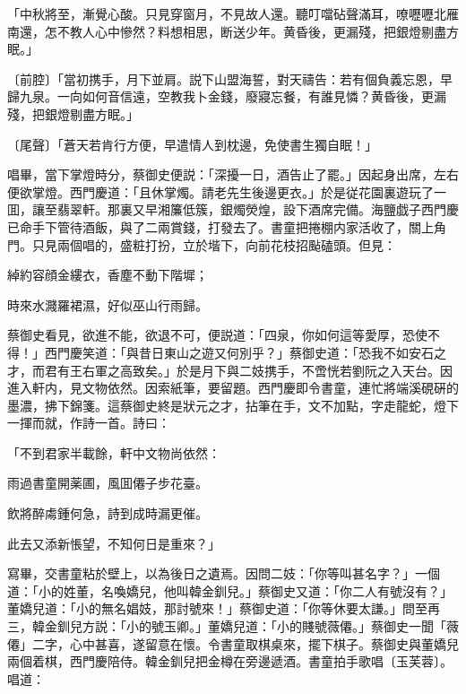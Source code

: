 \begin{myquote}
「中秋將至，漸覺心酸。只見穿窗月，不見故人還。聽叮噹砧聲滿耳，嘹嚦嚦北雁南還，怎不教人心中慘然？料想相思，断送少年。黄昏後，更漏殘，把銀燈剔盡方眠。」

{\markfont〔前腔〕}「當初携手，月下並肩。説下山盟海誓，對天禱告：若有個負義忘恩，早歸九泉。一向如何音信遠，空教我卜金錢，廢寢忘餐，有誰見憐？黄昏後，更漏殘，把銀燈剔盡方眠。」

{\markfont〔尾聲〕}「蒼天若肯行方便，早遣情人到枕邊，免使書生獨自眠！」
\end{myquote}

唱畢，當下掌燈時分，蔡御史便説：「深擾一日，酒告止了罷。」因起身出席，左右便欲掌燈。西門慶道：「且休掌燭。請老先生後邊更衣。」於是従花園裏遊玩了一囬，讓至翡翠軒。那裏又早湘簾低簇，銀燭熒煌，設下酒席完備。海鹽戯子西門慶已命手下管待酒飯，與了二兩賞錢，打發去了。書童把捲棚内家活收了，關上角門。只見兩個唱的，盛粧打扮，立於堦下，向前花枝招颭磕頭。但見：

\begin{myquote}
綽約容顔金縷衣，香塵不動下階墀；

時來水濺羅裙濕，好似巫山行雨歸。
\end{myquote}

蔡御史看見，欲進不能，欲退不可，便説道：「四泉，你如何這等愛厚，恐使不得！」西門慶笑道：「與昔日東山之遊又何別乎？」蔡御史道：「恐我不如安石之才，而君有王右軍之高致矣。」於是月下與二妓携手，不啻恍若劉阮之入天台。因進入軒内，見文物依然。因索紙筆，要留題。西門慶即令書童，連忙將端溪硯硏的墨濃，拂下錦箋。這蔡御史終是狀元之才，拈筆在手，文不加點，字走龍蛇，燈下一揮而就，作詩一首。詩曰：

\begin{myquote}
「不到君家半載餘，軒中文物尚依然：

雨過書童開薬圃，風囬僊子步花臺。

飲將醉䖏鍾何急，詩到成時漏更催。

此去又添新悵望，不知何日是重來？」
\end{myquote}

寫畢，交書童粘於壁上，以為後日之遺焉。因問二妓：「你等叫甚名字？」一個道：「小的姓董，名喚嬌兒，他叫韓金釧兒。」蔡御史又道：「你二人有號沒有？」董嬌兒道：「小的無名娼妓，那討號來！」蔡御史道：「你等休要太謙。」問至再三，韓金釧兒方説：「小的號玉卿。」董嬌兒道：「小的賤號薇僊。」蔡御史一聞「薇僊」二字，心中甚喜，遂留意在懷。令書童取棋桌來，擺下棋子。蔡御史與董嬌兒兩個着棋，西門慶陪侍。韓金釧兒把金樽在旁邊遞酒。書童拍手歌唱〔玉芙蓉〕。唱道：

